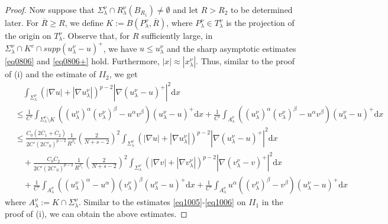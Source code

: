 \documentclass[12pt]{amsart}
\theoremstyle{definition}
\theoremstyle{remark}
\theoremstyle{conclusion}
\theoremstyle{conjecture}
\numberwithin{equation}{section}
\begin{document}
\begin{proof}
  Now suppose that $\Sigma_\lambda^\nu\cap R_\lambda^\nu(B_{R_1}) \neq \emptyset$ and let $R>R_2$ to be determined later. For $\overline{R}\geq R$, we define $K:=B(P_\lambda^\nu,\overline{R})$, where $P_\lambda^\nu \in T_\lambda^\nu$ is the projection of the origin on $T_\lambda^\nu$. Observe that, for $R$ sufficiently large, in $\Sigma_\lambda^\nu\cap K^c \cap supp(u^{\nu}_{\lambda}-u)^+$, we have $u \leq u^{\nu}_{\lambda}$ and the sharp asymptotic estimates \eqref{eq0806} and \eqref{eq0806+} hold. Furthermore, $|x| \approx |x^{\nu}_{\lambda}|$. Thus, similar to the proof of {(i)} and the estimate of $II_2$, we get
\begin{align}\label{eq1201}
&\quad \int_{\Sigma_\lambda^\nu} (|\nabla u|+|\nabla u^{\nu}_{\lambda}|)^{p-2} |\nabla(u^{\nu}_{\lambda}-u)^+|^2 \mathrm{d}x \\
&\leq \frac{1}{C'}\int_{\Sigma^\nu_\lambda \setminus K} ((u^\nu_{\lambda})^\alpha(v^\nu_{\lambda})^\beta- u^\alpha v^\beta)(u^\nu_{\lambda}-u)^+ \mathrm{d}x + \frac{1}{C'}\int_{A^\nu_\lambda}((u^\nu_{\lambda})^\alpha(v^\nu_{\lambda})^\beta- u^\alpha v^\beta) (u^\nu_{\lambda}-u)^+\mathrm{d}x  \nonumber\\
&\leq \frac{C_0(2\overline{C}_1+\overline{C}_2)}{2C'(2C'_0)^{p-2}} \frac{1}{R^{\beta_1}}\left(\frac{2}{N+s-2}\right)^2 \int_{\Sigma_\lambda^\nu}(|\nabla u|+|\nabla u^{\nu}_{\lambda}|)^{p-2} |\nabla (u^{\nu}_{\lambda}-u)^+|^2 \mathrm{d}x \nonumber\\
& \quad +\frac{ C_0\overline{C}_2}{2C'(2C'_0)^{p-2}}\frac{1}{R^{\beta_1}}\left(\frac{2}{N+s-2}\right)^2\int_{\Sigma_\lambda^\nu} (|\nabla v|+|\nabla v^{\nu}_{\lambda}|)^{p-2} |\nabla(v^{\nu}_{\lambda}-v )^+|^2 \mathrm{d}x  \nonumber\\
&\quad+\frac{1}{C'}\int_{A^\nu_\lambda} ((u^\nu_{\lambda})^\alpha-u^\alpha) (v^\nu_{\lambda})^\beta (u^\nu_{\lambda}-u)^+ \mathrm{d}x+ \frac{1}{C'}\int_{A^\nu_\lambda} u^\alpha((v^\nu_{\lambda})^\beta -v^{\beta})(u^\nu_{\lambda}-u)^+ \mathrm{d}x \nonumber
\end{align}
where $A_\lambda^\nu:=K\cap\Sigma_\lambda^\nu$. Similar to the estimates \eqref{eq1005}-\eqref{eq1006} on $II_1$ in the proof of {(i)}, we can obtain the above estimates.


\end{proof}
\end{document}

